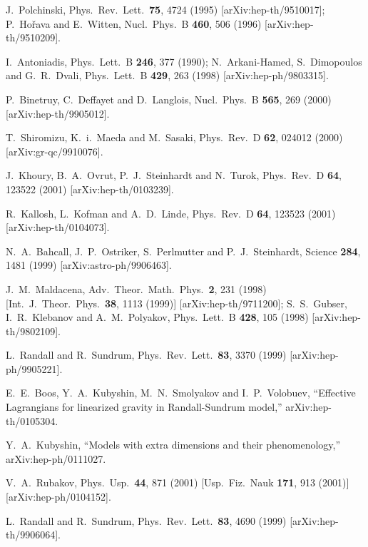 \documentclass[a4paper,preprint,nofootinbib,
                 showpacs,preprintnumbers,amsmath,amssymb]{revtex4}
\begin{document}
 
   \begin{thebibliography}{99} 
J.~Polchinski, 
Phys.\ Rev.\ Lett.\  {\bf 75}, 4724 (1995) 
[arXiv:hep-th/9510017]; 
P.~Ho\v{r}ava and E.~Witten, 
Nucl.\ Phys.\ B {\bf 460}, 506 (1996) 
[arXiv:hep-th/9510209]. 
 
I.~Antoniadis, 
Phys.\ Lett.\ B {\bf 246}, 377 (1990); 
N.~Arkani-Hamed, S.~Dimopoulos and G.~R.~Dvali, 
Phys.\ Lett.\ B {\bf 429}, 263 (1998) 
[arXiv:hep-ph/9803315]. 
 
P.~Binetruy, C.~Deffayet and D.~Langlois, 
Nucl.\ Phys.\ B {\bf 565}, 269 (2000) 
[arXiv:hep-th/9905012]. 
 
T.~Shiromizu, K.~i.~Maeda and M.~Sasaki, 
Phys.\ Rev.\ D {\bf 62}, 024012 (2000) [arXiv:gr-qc/9910076]. 
 
J.~Khoury, B.~A.~Ovrut, P.~J.~Steinhardt and N.~Turok, 
Phys.\ Rev.\ D {\bf 64}, 123522 (2001) 
[arXiv:hep-th/0103239]. 
 
R.~Kallosh, L.~Kofman and A.~D.~Linde, 
Phys.\ Rev.\ D {\bf 64}, 123523 (2001) 
[arXiv:hep-th/0104073]. 
 
N.~A.~Bahcall, J.~P.~Ostriker, S.~Perlmutter and P.~J.~Steinhardt, 
Science {\bf 284}, 1481 (1999) 
[arXiv:astro-ph/9906463]. 
 
J.~M.~Maldacena, 
Adv.\ Theor.\ Math.\ Phys.\  {\bf 2}, 231 (1998) 
[Int.\ J.\ Theor.\ Phys.\  {\bf 38}, 1113 (1999)] 
[arXiv:hep-th/9711200]; 
S.~S.~Gubser, I.~R.~Klebanov and A.~M.~Polyakov, 
Phys.\ Lett.\ B {\bf 428}, 105 (1998) 
[arXiv:hep-th/9802109]. 
 
L.~Randall and R.~Sundrum, 
Phys.\ Rev.\ Lett.\  {\bf 83}, 3370 (1999) 
[arXiv:hep-ph/9905221]. 
 
E.~E.~Boos, Y.~A.~Kubyshin, M.~N.~Smolyakov and I.~P.~Volobuev, 
``Effective Lagrangians for linearized gravity in Randall-Sundrum model,'' 
arXiv:hep-th/0105304. 
 
Y.~A.~Kubyshin, 
``Models with extra dimensions and their phenomenology,'' 
arXiv:hep-ph/0111027. 

V.~A.~Rubakov, 
Phys.\ Usp.\  {\bf 44}, 871 (2001) 
[Usp.\ Fiz.\ Nauk {\bf 171}, 913 (2001)] 
[arXiv:hep-ph/0104152]. 
 
L.~Randall and R.~Sundrum, 
Phys.\ Rev.\ Lett.\  {\bf 83}, 4690 (1999) 
[arXiv:hep-th/9906064]. 
 


\end{thebibliography}
\end{document}
